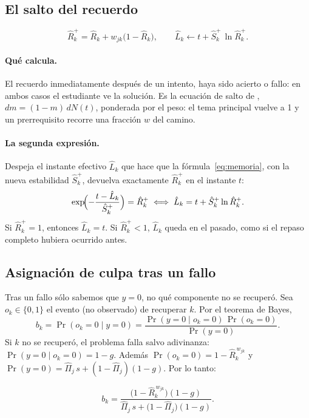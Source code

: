 \documentclass[11pt]{article}
\theoremstyle{definition}
\theoremstyle{remark}
\newcommand{\Rh}{\hat R}
\newcommand{\Sh}{\hat S}
\newcommand{\Lh}{\hat L}
\newcommand{\Pih}{\hat\Pi}
\begin{document}
\subsection{El salto del recuerdo}

\begin{equation}
\Rh_k^{+}=\Rh_k+w_{jk}\bigl(1-\Rh_k\bigr),\qquad \Lh_k\leftarrow t+\Sh_k^{+}\,\ln\Rh_k^{+}.
\label{eq:salto}
\end{equation}

\paragraph{Qué calcula.} El recuerdo inmediatamente después de un intento, haya sido acierto o fallo: en ambos casos el estudiante ve la solución. Es la ecuación de salto de \citet{tabibian2019}, $dm=(1-m)\,dN(t)$, ponderada por el peso: el tema principal vuelve a 1 y un prerrequisito recorre una fracción $w$ del camino.

\paragraph{La segunda expresión.} Despeja el instante efectivo $\Lh_k$ que hace que la fórmula~\eqref{eq:memoria}, con la nueva estabilidad $\Sh_k^+$, devuelva exactamente $\Rh_k^+$ en el instante $t$:
\[
\exp\!\Bigl(-\frac{t-\Lh_k}{\Sh_k^+}\Bigr)=\Rh_k^+\iff \Lh_k=t+\Sh_k^+\ln\Rh_k^+.
\]
Si $\Rh_k^+=1$, entonces $\Lh_k=t$. Si $\Rh_k^+<1$, $\Lh_k$ queda en el pasado, como si el repaso completo hubiera ocurrido antes.

\subsection{Asignación de culpa tras un fallo}

Tras un fallo sólo sabemos que $y=0$, no qué componente no se recuperó. Sea $o_k\in\{0,1\}$ el evento (no observado) de recuperar $k$. Por el teorema de Bayes,
\[
b_k=\Pr(o_k=0\mid y=0)=\frac{\Pr(y=0\mid o_k=0)\,\Pr(o_k=0)}{\Pr(y=0)}.
\]
Si $k$ no se recuperó, el problema falla salvo adivinanza: $\Pr(y=0\mid o_k=0)=1-g$. Además $\Pr(o_k=0)=1-\Rh_k^{\,w_{jk}}$ y $\Pr(y=0)=\Pih_j\,s+(1-\Pih_j)(1-g)$. Por lo tanto:

\begin{equation}
b_k=\frac{\bigl(1-\Rh_k^{\,w_{jk}}\bigr)(1-g)}{\Pih_j\,s+\bigl(1-\Pih_j\bigr)(1-g)}.
\label{eq:culpa-completa}
\end{equation}
\end{document}
